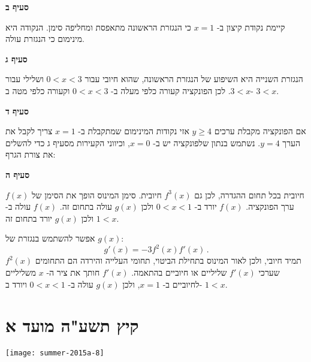 \np

\textbf{סעיף ב}

קיימת נקודת קיצון ב-%
$x=1$
כי הנגזרת הראשונה מתאפסת ומחליפה סימן. הנקודה היא מינימום כי הנגזרת עולה.


\textbf{סעיף ג}

הנגזרת השנייה היא השיפוע של הנגזרת הראשונה, שהוא חיובי עבור
$0<x<3$
ושלילי עבור
$3<x$.
לכן הפונקציה קעורה כלפי מעלה ב-%
$0<x<3$
וקעורה כלפי מטה ב-%
$3<x$.


\textbf{סעיף ד}

אם הפונקציה מקבלת ערכים 
$y\geq 4$
אזי נקודות המינימום שמתקבלת ב-%
$x=1$
צריך לקבל את הערך
$y=4$.
נשתמש בנתון שלפונקציה יש 
\asm{}
ב-%
$x=0$,
וכיווני הקעירות מסעיף ג כדי להשלים את צורת הגרף:

\begin{center}
\end{center}


\textbf{סעיף ה}

$f(x)$
חיובית בכל תחום ההגדרה, לכן גם
$f^3(x)$
חיובית. סימן המינוס הופך את הסימן של ערך הפונקציה. 
$f(x)$
יורד ב-%
$0<x<1$
ולכן 
$g(x)$
עולה בתחום זה.
$f(x)$
עולה ב-%
$1<x$
ולכן 
$g(x)$
יורד בתחום זה.

אפשר להשתמש בנגזרת של
$g(x)$:
\[
g'(x)=-3 f^2(x) f'(x)\,.
\]
$f^2(x)$
תמיד חיובי, ולכן לאור המינוס בתחילת הביטוי, תחומי העלייה והירדה הם התחומים שערכי
$f'(x)$
שליליים או חיוביים בהתאמה.
$f'(x)$
חותך את ציר ה-%
$x$
משליליים לחיוביים ב-%
$x=1$,
ולכן 
$g(x)$
עולה ב-%
$0<x<1$
ויורד ב-%
$1<x$.


\np



\section{קיץ תשע"ה מועד א}

\begin{center}
\texttt{[image: summer-2015a-8]}
\end{center}

